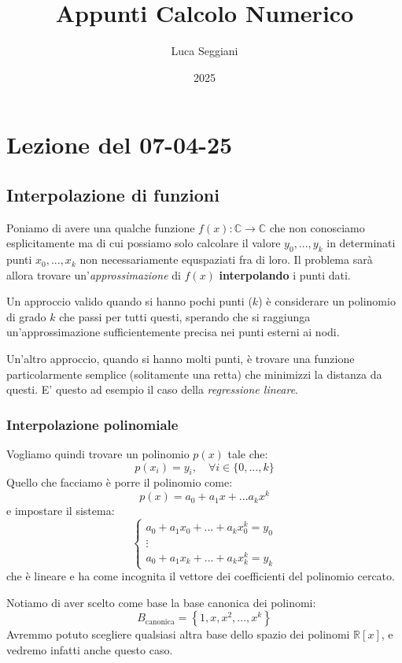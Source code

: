 \documentclass[a4paper,11pt]{article}
\title{Appunti Calcolo Numerico}
\author{Luca Seggiani}
\date{2025}
\begin{document}
\section{Lezione del 07-04-25}

\thispagestyle{empty}
\pagestyle{fancy}

\subsection{Interpolazione di funzioni}
Poniamo di avere una qualche funzione $f(x) : \mathbb{C} \rightarrow \mathbb{C}$ che non conosciamo esplicitamente ma di cui possiamo solo calcolare il valore $y_0, ..., y_k$ in determinati punti $x_0, ..., x_k$ non necessariamente equspaziati fra di loro.
Il problema sarà allora trovare un'\textit{approssimazione} di $f(x)$ \textbf{interpolando} i punti dati.

Un approccio valido quando si hanno pochi punti ($k$) è considerare un polinomio di grado $k$ che passi per tutti questi, sperando che si raggiunga un'approssimazione sufficientemente precisa nei punti esterni ai nodi.

Un'altro approccio, quando si hanno molti punti, è trovare una funzione particolarmente semplice (solitamente una retta) che minimizzi la distanza da questi.
E' questo ad esempio il caso della \textit{regressione lineare}.

\subsubsection{Interpolazione polinomiale}
Vogliamo quindi trovare un polinomio $p(x)$ tale che:
$$
p(x_i) = y_i, \quad \forall i \in \{ 0, ..., k \}
$$
Quello che facciamo è porre il polinomio come:
$$
p(x) = a_0 + a_1 x + ... a_k x^k
$$
e impostare il sistema:
\[
	\begin{cases}
		a_0 + a_1 x_0 + ... + a_k x_0^k = y_0 \\ 
		\vdots \\
		a_0 + a_1 x_k + ... + a_k x_k^k = y_k
	\end{cases}
\]
che è lineare e ha come incognita il vettore dei coefficienti del polinomio cercato.

Notiamo di aver scelto come base la base canonica dei polinomi:
$$
B_\text{canonica} = \left\{ 1, x, x^2, ..., x^k \right\}
$$
Avremmo potuto scegliere qualsiasi altra base dello spazio dei polinomi $\mathbb{R}[x]$, e vedremo infatti anche questo caso.
\end{document}
